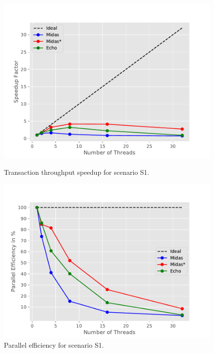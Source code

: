 \begin{figure}[h!]
\begin{minipage}[l]{0.50\textwidth}
    \includegraphics[width=\textwidth]{figures/bench/spd-ss}
    \caption{Transaction throughput speedup for scenario S1.}
    \label{fig:spd-s1}
\end{minipage}
\begin{minipage}[l]{0.50\textwidth}
    \includegraphics[width=\textwidth]{figures/bench/eff-ss}
    \caption{Parallel efficiency for scenario S1.}

\end{minipage}
\end{figure}
